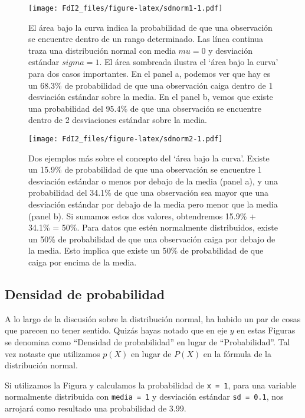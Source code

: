 \documentclass[spanish,]{book}
\begin{document}
\begin{figure}
\centering
\texttt{[image: FdI2\_files/figure-latex/sdnorm1-1.pdf]}
\caption{\label{fig:sdnorm1}El área bajo la curva indica la probabilidad de
que una observación se encuentre dentro de un rango determinado. Las
línea continua traza una distribución normal con media \(mu=0\) y
desviación estándar \(sigma=1\). El área sombreada ilustra el `área bajo
la curva' para dos casos importantes. En el panel a, podemos ver que hay
es un 68.3\% de probabilidad de que una observación caiga dentro de 1
desviación estándar sobre la media. En el panel b, vemos que existe una
probabilidad del 95.4\% de que una observación se encuentre dentro de 2
desviaciones estándar sobre la media.}
\end{figure}

\begin{figure}
\centering
\texttt{[image: FdI2\_files/figure-latex/sdnorm2-1.pdf]}
\caption{\label{fig:sdnorm2}Dos ejemplos más sobre el concepto del `área
bajo la curva'. Existe un 15.9\% de probabilidad de que una observación
se encuentre 1 desviación estándar o menos por debajo de la media (panel
a), y una probabilidad del 34.1\% de que una observación sea mayor que
una desviación estándar por debajo de la media pero menor que la media
(panel b). Si sumamos estos dos valores, obtendremos 15.9\% + 34.1\% =
50\%. Para datos que estén normalmente distribuidos, existe un 50\% de
probabilidad de que una observación caiga por debajo de la media. Esto
implica que existe un 50\% de probabilidad de que caiga por encima de la
media.}
\end{figure}

\subsection{Densidad de probabilidad}\label{density}

A lo largo de la discusión sobre la distribución normal, ha habido un
par de cosas que parecen no tener sentido. Quizás hayas notado que en
eje \(y\) en estas Figuras se denomina como ``Densidad de probabilidad''
en lugar de ``Probabilidad''. Tal vez notaste que utilizamos \(p(X)\) en
lugar de \(P(X)\) en la fórmula de la distribución normal.

Si utilizamos la Figura y calculamos la probabilidad de
\texttt{x\ =\ 1}, para una variable normalmente distribuida con
\texttt{media\ =\ 1} y desviación estándar \texttt{sd\ =\ 0.1}, nos
arrojará como resultado una probabilidad de 3.99.
\end{document}
